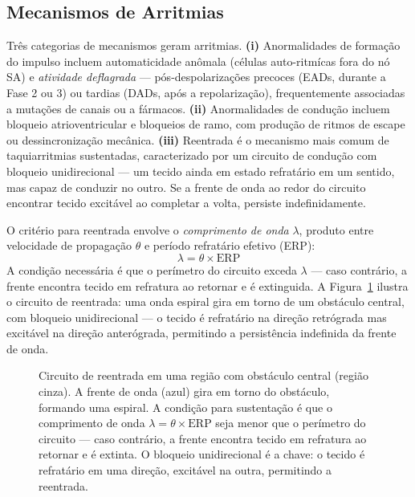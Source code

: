 \subsection{Mecanismos de Arritmias}
\label{sub:image12-arrit}

Três categorias de mecanismos geram arritmias. \textbf{(i)} Anormalidades
de formação do impulso incluem automaticidade anômala (células
auto-ritmícas fora do nó SA) e \emph{atividade deflagrada} --- pós-despolarizações
precoces (EADs, durante a Fase 2 ou 3) ou tardias (DADs, após a
repolarização), frequentemente associadas a mutações de canais ou a
fármacos. \textbf{(ii)} Anormalidades de condução incluem bloqueio
atrioventricular e bloqueios de ramo, com produção de ritmos de escape ou
dessincronização mecânica. \textbf{(iii)} Reentrada é o mecanismo mais
comum de taquiarritmias sustentadas, caracterizado por um circuito de
condução com bloqueio unidirecional --- um tecido ainda em estado
refratário em um sentido, mas capaz de conduzir no outro. Se a frente
de onda ao redor do circuito encontrar tecido excitável ao completar a
volta, persiste indefinidamente.

O critério para reentrada envolve o \emph{comprimento de onda} $\lambda$,
produto entre velocidade de propagação $\theta$ e período refratário
efetivo (ERP):
\begin{equation}
\lambda = \theta \times \mathrm{ERP}
\end{equation}
A condição necessária é que o perímetro do circuito exceda $\lambda$ ---
caso contrário, a frente encontra tecido em refratura ao retornar e é
extinguida. A Figura~\ref{fig:12-reentry} ilustra o circuito de
reentrada: uma onda espiral gira em torno de um obstáculo central,
com bloqueio unidirecional --- o tecido é refratário na direção
retrógrada mas excitável na direção anterógrada, permitindo a
persistência indefinida da frente de onda.

\begin{figure}[htbp]
\centering
{}
\caption{Circuito de reentrada em uma região com obstáculo central (região cinza). A frente de onda (azul) gira em torno do obstáculo, formando uma espiral. A condição para sustentação é que o comprimento de onda $\lambda = \theta \times \mathrm{ERP}$ seja menor que o perímetro do circuito --- caso contrário, a frente encontra tecido em refratura ao retornar e é extinta. O bloqueio unidirecional é a chave: o tecido é refratário em uma direção, excitável na outra, permitindo a reentrada.}
\label{fig:12-reentry}
\end{figure}

